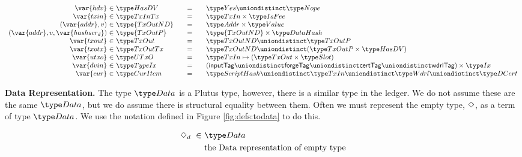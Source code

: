 \begin{figure*}[htb]
\begin{equation*}
\begin{array}{r@{~\in~}l@{\qquad=\qquad}lr}
      \var{hdv}
      & \HasDV
      & \Yes \uniondistinct \Nope
      \\
      \var{txin}
      & \TxInTx
      & \TxIn \times \IsFee
      \\
      (\var{addr}, v)
      & \type{TxOutND}
      & \Addr \times \Value
      \\
      (\var{addr}, v, \var{hashscr_d})
      & \type{TxOutP}
      & \type{TxOutND} \times \DataHash
      \\
      \var{txout}
      & \TxOut
      & \TxOutND \uniondistinct \TxOutP
      \\
      \var{txotx}
      & \TxOutTx
      & \TxOutND \uniondistinct (\TxOutP \times \HasDV)
      \\
      \var{utxo}
      & \UTxO
      & \TxIn \mapsto (\TxOut \times \Slot)
      \\
      \var{dvin}
      & \TypeIx
      & (\mathsf{inputTag} \uniondistinct \mathsf{forgeTag} \uniondistinct
      \mathsf{certTag} \uniondistinct \mathsf{wdrlTag}) \times \Ix
      \\
      \var{cur}
      & \CurItem
      & \ScriptHash \uniondistinct \TxIn \uniondistinct \Wdrl \uniondistinct \DCert
    \end{array}
  \end{equation*}
  \caption{Definitions used in the UTxO transition system}
  \label{fig:defs:utxo-shelley-1}
\end{figure*}


\textbf{Data Representation.}
The type $\Data$ is a Plutus type, however, there is a similar type in the
ledger. We do not assume these are the same $\Data$, but we do assume there
is structural equality between them. Often we must represent the empty type,
$\Diamond$, as a term of type $\Data$. We use the notation defined in
Figure \ref{fig:defs:todata} to do this.

\begin{figure*}[htb]
  \begin{align*}
    \Nothing_d ~\in~& \Data \\
    & \text{the Data representation of empty type} \\
  \end{align*}
  \caption{Empty Data Representation}
  \label{fig:defs:todata}
\end{figure*}

